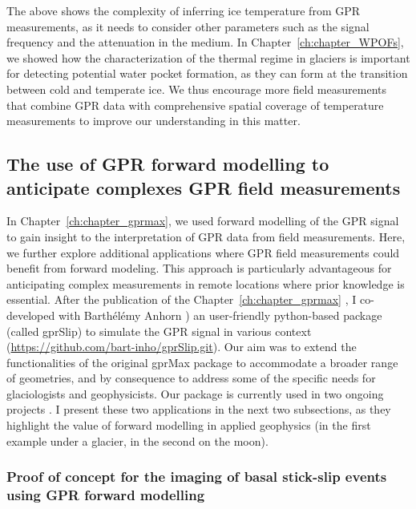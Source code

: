 The above shows the complexity of inferring ice temperature from GPR measurements, as it needs to consider other parameters such as the signal frequency and the attenuation in the medium. In Chapter~\ref{ch:chapter_WPOFs}, we showed how the characterization of the thermal regime in glaciers is important for detecting potential water pocket formation, as they can form at the transition between cold and temperate ice. We thus encourage more field measurements that combine GPR data with comprehensive spatial coverage of temperature measurements to improve our understanding in this matter.


\subsection{The use of GPR forward modelling to anticipate complexes GPR field measurements}

In Chapter~\ref{ch:chapter_gprmax}, we used forward modelling of the GPR signal to gain insight to the interpretation of GPR data from field measurements. Here, we further explore additional applications where GPR field measurements could benefit from forward modeling. This approach is particularly advantageous for anticipating complex measurements in remote locations where prior knowledge is essential. After the publication of the Chapter~\ref{ch:chapter_gprmax} \citep{Ogier&al2023}, I co-developed with Barthélémy Anhorn \citep[as part of his master thesis at ETHZ, see][]{Anhorn2024}) an user-friendly python-based package (called gprSlip) to simulate the GPR signal in various context (\url{https://github.com/bart-inho/gprSlip.git}). Our aim was to extend the functionalities of the original gprMax package \citep{Warren&al2016} to accommodate a broader range of geometries, and by consequence to address some of the specific needs for glaciologists and geophysicists. Our package is currently used in two ongoing projects \citep{Aichele&al2024,Mittelholz&al2024}. I present these two applications in the next two subsections, as they highlight the value of forward modelling in applied geophysics (in the first example under a glacier, in the second on the moon). 

\subsubsection{Proof of concept for the imaging of basal stick-slip events using GPR forward modelling}
 
